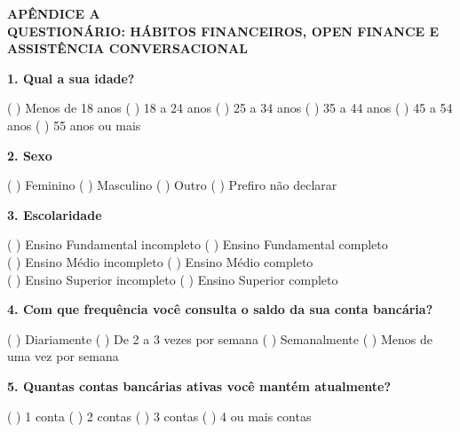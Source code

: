 \newpage
\setlength{\parindent}{0pt}

\begin{center}
    \fontsize{14pt}{14pt}\selectfont\bfseries APÊNDICE A\\[12pt]
    \fontsize{12pt}{12pt}\selectfont QUESTIONÁRIO: HÁBITOS FINANCEIROS, OPEN FINANCE E ASSISTÊNCIA CONVERSACIONAL
\end{center}

\vspace{10pt}

\textbf{1. Qual a sua idade?}

\vspace{4pt}
( ) Menos de 18 anos \quad ( ) 18 a 24 anos \quad ( ) 25 a 34 anos \quad ( ) 35 a 44 anos \quad ( ) 45 a 54 anos \quad ( ) 55 anos ou mais

\vspace{10pt}

\textbf{2. Sexo}

\vspace{4pt}
( ) Feminino \quad ( ) Masculino \quad ( ) Outro \quad ( ) Prefiro não declarar

\vspace{10pt}

\textbf{3. Escolaridade}

\vspace{4pt}
( ) Ensino Fundamental incompleto \quad ( ) Ensino Fundamental completo\\
( ) Ensino Médio incompleto \quad ( ) Ensino Médio completo\\
( ) Ensino Superior incompleto \quad ( ) Ensino Superior completo

\vspace{10pt}

\textbf{4. Com que frequência você consulta o saldo da sua conta bancária?}

\vspace{4pt}
( ) Diariamente \quad ( ) De 2 a 3 vezes por semana \quad ( ) Semanalmente \quad ( ) Menos de uma vez por semana

\vspace{10pt}

\textbf{5. Quantas contas bancárias ativas você mantém atualmente?}

\vspace{4pt}
( ) 1 conta \quad ( ) 2 contas \quad ( ) 3 contas \quad ( ) 4 ou mais contas

